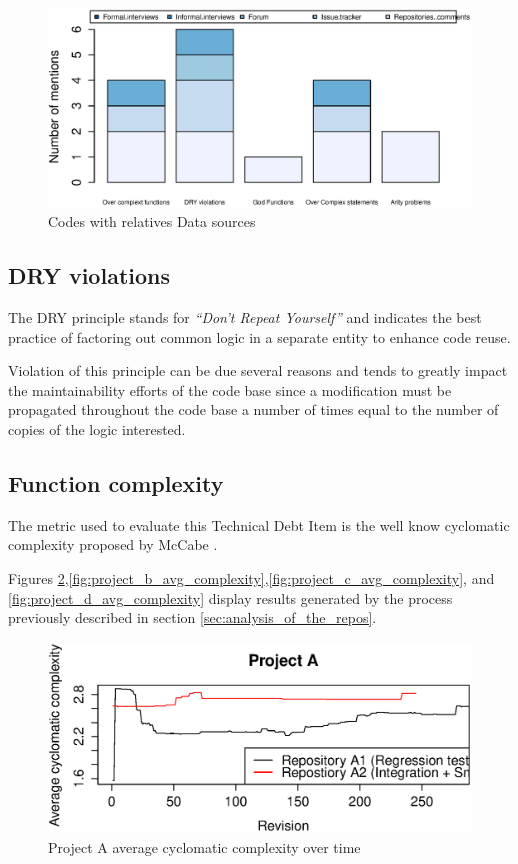 \begin{figure}[!Htb]
    \centering
    \includegraphics[width=\textwidth,keepaspectratio]{figure/results/rq1/sources.eps}
    \caption{Codes with relatives Data sources}
    \label{fig:rq1_sources}
\end{figure}


\subsection{DRY violations}
The DRY principle stands for \textit{``Don't Repeat Yourself''} and indicates the best practice of factoring out common logic in a separate entity to enhance code reuse.

Violation of this principle can be due several reasons and tends to greatly impact the maintainability efforts of the code base since a modification must be propagated throughout the code base a number of times equal to the number of copies of the logic interested.
    
\subsection{Function complexity}
The metric used to evaluate this Technical Debt Item is the well know cyclomatic complexity proposed by McCabe \cite{cyclomatic_complexity}.


    Figures \ref{fig:project_a_avg_complexity},\ref{fig:project_b_avg_complexity},\ref{fig:project_c_avg_complexity}, and \ref{fig:project_d_avg_complexity} display results generated by the process previously described in section \ref{sec:analysis_of_the_repos}.
    
    
\begin{figure}[!Htb]
    \centering
    \includegraphics[width=\textwidth,keepaspectratio]{figure/results/rq1/project_a_avg_complexity.eps}
    \caption{Project A average cyclomatic complexity over time}
    \label{fig:project_a_avg_complexity}
\end{figure}

